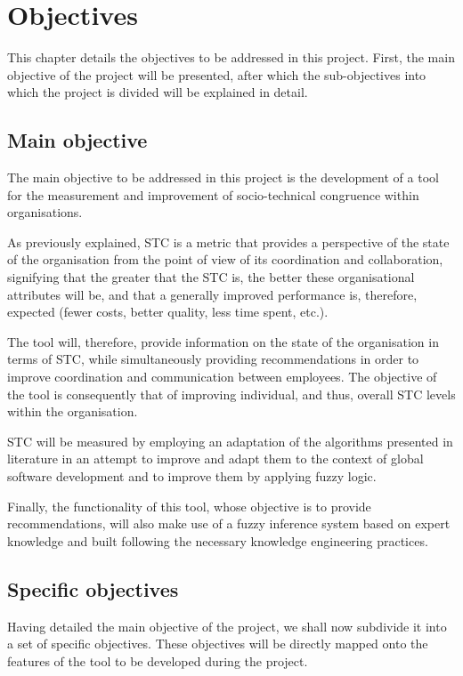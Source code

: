 \chapter{Objectives}
\label{cap:objectives}

This chapter details the objectives to be addressed in this project. First, the main objective of the project will be presented, after which the sub-objectives into which the project is divided will be explained in detail.

\section{Main objective}

The main objective to be addressed in this project is the development of a tool for the measurement and improvement of socio-technical congruence within organisations.

As previously explained, STC is a metric that provides a perspective of the state of the organisation from the point of view of its coordination and collaboration, signifying that the greater that the STC is, the better these organisational attributes will be, and that a generally improved performance is, therefore, expected (fewer costs, better quality, less time spent, etc.).

The tool will, therefore, provide information on the state of the organisation in terms of STC, while simultaneously providing recommendations in order to improve coordination and communication between employees. The objective of the tool is consequently that of improving individual, and thus, overall STC levels within the organisation.

STC will be measured by employing an adaptation of the algorithms presented in literature in an attempt to improve and adapt them to the context of global software development and to improve them by applying fuzzy logic.

Finally, the functionality of this tool, whose objective is to provide recommendations, will also make use of a fuzzy inference system based on expert knowledge and built following the necessary knowledge engineering practices.

\section{Specific objectives}

Having detailed the main objective of the project, we shall now subdivide it into a set of specific objectives. These objectives will be directly mapped onto the features of the tool to be developed during the project.

